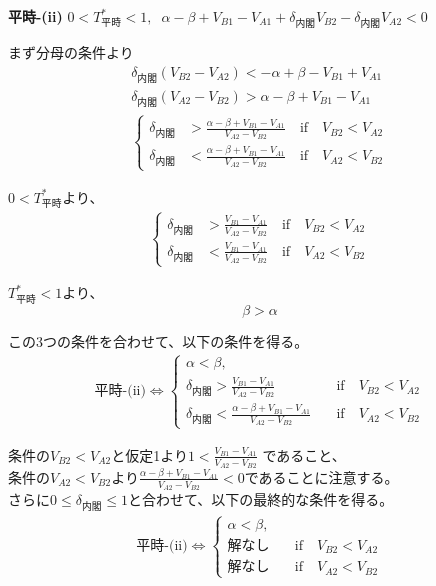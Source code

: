 \documentclass[main.tex]{subfiles}
\begin{document}
\bigskip
\noindent
\textbf{平時-(ii)}\; $0<T^*_{平時}<1,\;\; \alpha-\beta + V_{B1}-V_{A1} + \delta_{内閣}V_{B2} - \delta_{内閣}V_{A2}　< 0$

まず分母の条件より
\begin{align*}
    \delta_{内閣}(V_{B2} - V_{A2}) < -\alpha+\beta - V_{B1}+V_{A1} \\
    \delta_{内閣}(V_{A2} - V_{B2}) > \alpha-\beta + V_{B1}-V_{A1}\\
    \begin{cases}
        \delta_{内閣} &> \frac{\alpha-\beta + V_{B1}-V_{A1}}{V_{A2} - V_{B2}} \quad\text{if}\quad V_{B2} < V_{A2}\\
        \delta_{内閣} &< \frac{\alpha-\beta + V_{B1}-V_{A1}}{V_{A2} - V_{B2}} \quad\text{if}\quad V_{A2} < V_{B2}
    \end{cases}
\end{align*}


$0<T^*_{平時}$より、
\begin{align*}
    \begin{cases}
        \delta_{内閣} &> \frac{V_{B1} - V_{A1}}{V_{A2} - V_{B2}} \quad\text{if}\quad V_{B2} < V_{A2}\\
        \delta_{内閣} &< \frac{V_{B1} - V_{A1}}{V_{A2} - V_{B2}} \quad\text{if}\quad V_{A2} < V_{B2}
      \end{cases}
\end{align*}

$T^*_{平時}<1$より、
$$\beta > \alpha$$

この3つの条件を合わせて、以下の条件を得る。
\begin{align*}
    \text{平時-(ii)} \Leftrightarrow 
    \begin{cases}
        \alpha < \beta, \\
        \delta_{内閣} > \frac{V_{B1} - V_{A1}}{V_{A2} - V_{B2}} \quad&\text{if}\quad V_{B2} < V_{A2}\\
        \delta_{内閣} < \frac{\alpha-\beta + V_{B1}-V_{A1}}{V_{A2} - V_{B2}} \quad&\text{if}\quad V_{A2} < V_{B2}
    \end{cases}
\end{align*}

\noindent
条件の$V_{B2} < V_{A2}$と仮定1より$1 < \frac{V_{B1} - V_{A1}}{V_{A2} - V_{B2}}$ であること、\\
条件の$V_{A2} < V_{B2}$より$\frac{\alpha-\beta + V_{B1}-V_{A1}}{V_{A2} - V_{B2}} < 0$であることに注意する。\\
さらに$0 \le \delta_{内閣} \le 1$と合わせて、以下の最終的な条件を得る。
\begin{align*}
    \text{平時-(ii)} \Leftrightarrow 
    \begin{cases}
        \alpha < \beta, \\
        解なし \quad&\text{if}\quad V_{B2} < V_{A2}\\
        解なし \quad&\text{if}\quad V_{A2} < V_{B2}
    \end{cases}
\end{align*}
\end{document}
